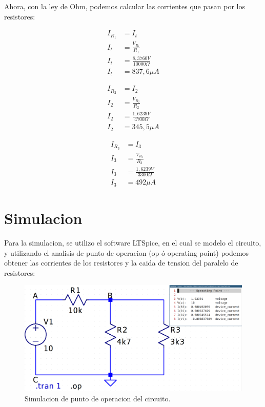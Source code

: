 \documentclass[a4paper,12pt, spanish]{report}
\begin{document}
      Ahora, con la ley de Ohm, podemos calcular las corrientes que pasan por los resistores:
      \begin{figure}[!h]
      \centering
      \begin{minipage}{0.3\textwidth}
        \begin{align*}
          I_{R_1} &= I_t\\
          I_t &= \frac{V_{R_1}}{R_1}\\
          I_t &= \frac{8,3760V}{10000\Omega}\\
          I_t &= 837,6\mu A
        \end{align*}
      \end{minipage}
      \centering
      \begin{minipage}{0.3\textwidth}
        \begin{align*}
          I_{R_2} &= I_2\\
          I_2 &= \frac{V_{R_2}}{R_2}\\
          I_2 &= \frac{1,6239V}{4700\Omega}\\
          I_2 &= 345,5\mu A
        \end{align*}
      \end{minipage}
      \centering
      \begin{minipage}{0.3\textwidth}
        \begin{align*}
          I_{R_3} &= I_3\\
          I_3 &= \frac{V_{R_3}}{R_3}\\
          I_3 &= \frac{1,6239V}{3300\Omega}\\
          I_3 &= 492\mu A
        \end{align*}
      \end{minipage}
      \end{figure}
      
      \section{Simulacion}
      Para la simulacion, se utilizo el software LTSpice, en el cual se modelo el circuito, y utilizando el analisis de
      punto de operacion (op ó operating point) podemos obtener las corrientes de los resistores y la caida de
      tension del paralelo de resistores:
      \begin{figure}[!h]
        \centering
        \includegraphics[width=0.8\linewidth]{images/sim_dc.png}

        \caption{Simulacion de punto de operacion del circuito.}
      \end{figure}
\end{document}
